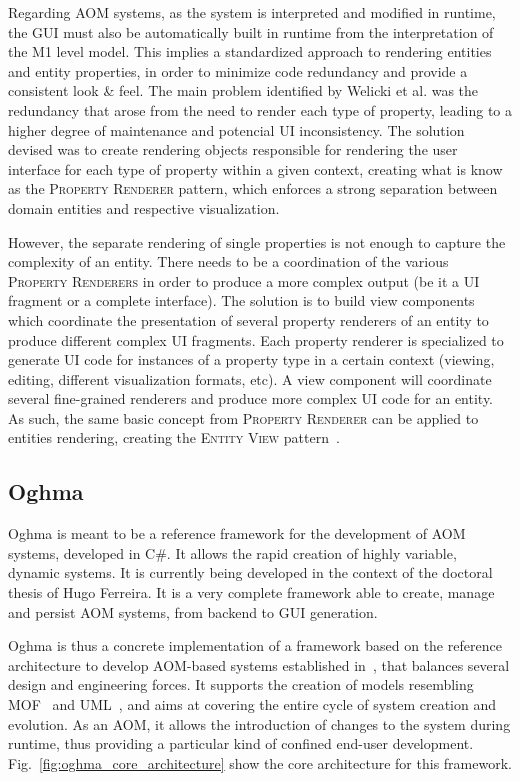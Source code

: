 Regarding AOM systems, as the system is interpreted and modified in runtime, the GUI must also be automatically built in runtime from the interpretation of the M1 level model. This implies a standardized approach to rendering entities and entity properties, in order to minimize code redundancy and provide a consistent look \& feel. The main problem identified by Welicki et al.\cite{WYW07} was the redundancy that arose from the need to render each type of property, leading to a higher degree of maintenance and potencial UI inconsistency. The solution devised was to create rendering objects responsible for rendering the user interface for each type of property within a given context, creating what is know as the \textsc{Property Renderer} pattern, which enforces a strong separation between domain entities and respective visualization.

However, the separate rendering of single properties is not enough to capture the complexity of an entity. There needs to be a coordination of the various \textsc{Property Renderers} in order to produce a more complex output (be it a UI fragment or a complete interface). The solution is to build view components which coordinate the presentation of several property renderers of an entity to produce different complex UI fragments. Each property renderer is specialized to generate UI code for instances of a property type in a certain context (viewing, editing, different visualization formats, etc). A view component will coordinate several fine-grained renderers and produce more complex UI code for an entity. As such, the same basic concept from \textsc{Property Renderer} can be applied to entities rendering, creating the \textsc{Entity View} pattern~\cite{WYW07}.

\subsection{Oghma}\label{sec:oghma}

Oghma is meant to be a reference framework for the development of AOM systems, developed in C\#. It allows the rapid creation of highly variable, dynamic systems. It is currently being developed in the context of the doctoral thesis of Hugo Ferreira. It is a very complete framework able to create, manage and persist AOM systems, from backend to GUI generation.

Oghma is thus a concrete implementation of a framework based on the reference architecture to develop AOM-based systems established in~\cite{ferreira_phd_2010}, that balances several design and engineering forces. It supports the creation of models resembling MOF~\cite{mof} and UML~\cite{uml}, and aims at covering the entire cycle of system creation and evolution. As an AOM, it allows the introduction of changes to the system during runtime, thus providing a particular kind of confined end-user development. Fig.~\ref{fig:oghma_core_architecture} show the core architecture for this framework.

